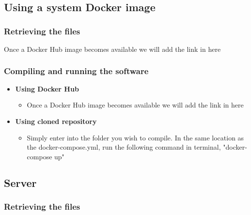 \documentclass[a4paper,12pt]{article}
\begin{document}
    	\subsection{Using a system Docker image}
    	
    		\subsubsection {Retrieving the files}
    		
    		Once a Docker Hub image becomes available we will add the link in here
    		
    		\subsubsection {Compiling and running the software}
    		
   		  	\begin{itemize}
    			\item \textbf{Using Docker Hub}
    			\begin{itemize}
    				\item Once a Docker Hub image becomes available we will add the link in here
    			\end{itemize}
    		\end{itemize}
   		  	\begin{itemize}
    			\item \textbf{Using cloned repository}
    			\begin{itemize}
    				\item Simply enter into the folder you wish to compile. In the same location as the docker-compose.yml, run the following command in terminal, "docker-compose up"
    			\end{itemize}
    		\end{itemize}

     	\subsection{Server}
     	
	    	\subsubsection {Retrieving the files}
	    	
\end{document}
